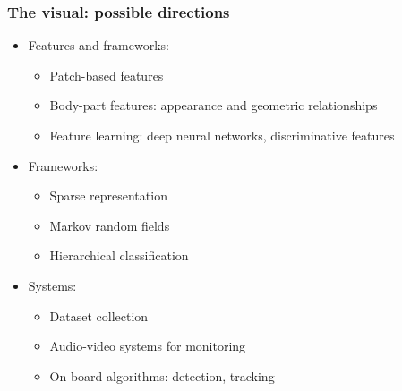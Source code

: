 \documentclass[mathserif]{beamer}
\begin{document}
\begin{frame}
\frametitle{The visual: possible directions}
\begin{itemize}
\item<2-> Features and frameworks: 
\begin{itemize}
\item Patch-based features 
\item Body-part features: appearance and geometric relationships
\item Feature learning: deep neural networks, discriminative features
\end{itemize}
\item<3-> Frameworks:
\begin{itemize}
\item Sparse representation
\item Markov random fields
\item Hierarchical classification 
\end{itemize}
\item<4-> Systems:
\begin{itemize}
\item Dataset collection
\item Audio-video systems for monitoring
\item On-board algorithms: detection, tracking
\end{itemize}
\end{itemize}
\end{frame}
\end{document}
